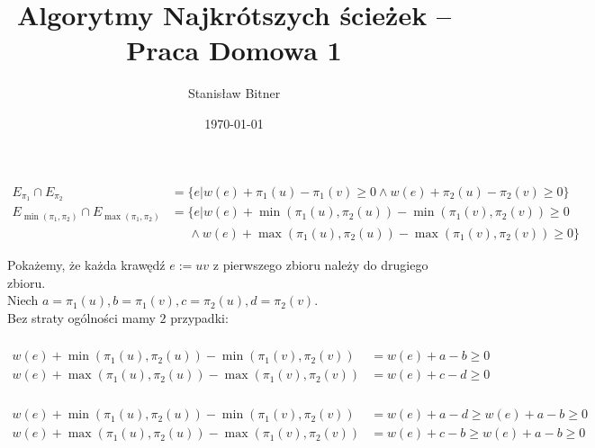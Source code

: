 \documentclass[11pt]{article}
\title{Algorytmy Najkrótszych ścieżek -- Praca Domowa 1}
\author{Stanisław Bitner}
\date{\today}
\begin{document}
\maketitle

\section{}

\begin{align*}
    E_{\pi_1} \cap E_{\pi_2}
    &=
    \{
        e \big|
        w(e) + \pi_1(u) - \pi_1(v) \ge 0
        \land
        w(e) + \pi_2(u) - \pi_2(v) \ge 0
    \}
    \\
    E_{\min(\pi_1,\pi_2)} \cap E_{\max(\pi_1,\pi_2)}
    &=
    \{
        e \big|
        w(e) + \min(\pi_1(u),\pi_2(u)) - \min(\pi_1(v),\pi_2(v)) \ge 0
        \\&\;\;\;\;\;\land
        w(e) + \max(\pi_1(u),\pi_2(u)) - \max(\pi_1(v),\pi_2(v)) \ge 0
    \}
\end{align*}

Pokażemy, że każda krawędź $e := uv$ z pierwszego zbioru należy do drugiego
zbioru.\\
Niech $a = \pi_1(u), b = \pi_1(v), c = \pi_2(u), d = \pi_2(v)$.\\
Bez straty ogólności mamy $2$ przypadki:

\subsubsection*{}

\begin{align*}
    w(e) + \min(\pi_1(u),\pi_2(u)) - \min(\pi_1(v),\pi_2(v)) &= w(e) + a - b \ge 0\\
    w(e) + \max(\pi_1(u),\pi_2(u)) - \max(\pi_1(v),\pi_2(v)) &= w(e) + c - d \ge 0
\end{align*}

\subsubsection*{}

\begin{align*}
    w(e) + \min(\pi_1(u),\pi_2(u)) - \min(\pi_1(v),\pi_2(v)) &= w(e) + a - d \ge w(e) + a - b \ge 0\\
    w(e) + \max(\pi_1(u),\pi_2(u)) - \max(\pi_1(v),\pi_2(v)) &= w(e) + c - b \ge w(e) + a - b \ge 0
\end{align*}
\end{document}
